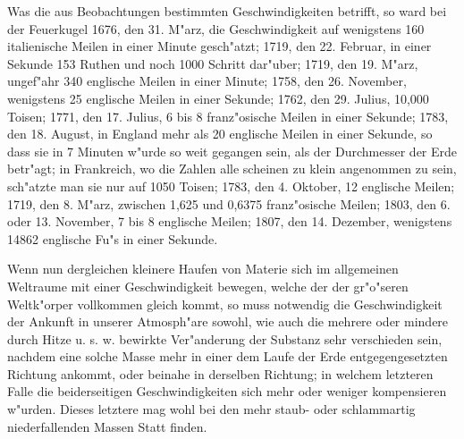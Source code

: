 \documentclass[a4paper, 11pt, oneside, polutonikogreek, german]{article}
\begin{document}
Was die aus Beobachtungen bestimmten Geschwindigkeiten betrifft, so ward bei der Feuerkugel 1676, den 31. M"arz, die Geschwindigkeit auf wenigstens 160 italienische Meilen in einer Minute gesch"atzt; 1719, den 22. Februar, in einer Sekunde 153 Ruthen und noch 1000 Schritt dar"uber; 1719, den 19. M"arz, ungef"ahr 340 englische Meilen in einer Minute; 1758, den 26. November, wenigstens 25 englische Meilen in einer Sekunde; 1762, den 29. Julius, 10,000 Toisen; 1771, den 17. Julius, 6 bis 8 franz"osische Meilen in einer Sekunde; 1783, den 18. August, in England mehr als 20 englische Meilen in einer Sekunde, so dass sie in 7 Minuten w"urde so weit gegangen sein, als der Durchmesser der Erde betr"agt; in Frankreich, wo die Zahlen alle scheinen zu klein angenommen zu sein, sch"atzte man sie nur auf 1050 Toisen; 1783, den 4. Oktober, 12 englische Meilen; 1719, den 8. M"arz, zwischen 1,625 und 0,6375 franz"osische Meilen; 1803, den 6. oder 13. November, 7 bis 8 englische Meilen; 1807, den 14. Dezember, wenigstens 14862 englische Fu"s in einer Sekunde.

Wenn nun dergleichen kleinere Haufen von Materie sich im allgemeinen Weltraume mit einer Geschwindigkeit bewegen, welche der der gr"o"seren Weltk"orper vollkommen gleich kommt, so muss notwendig die Geschwindigkeit der Ankunft in unserer Atmosph"are sowohl, wie auch die mehrere oder mindere durch Hitze u. s. w. bewirkte Ver"anderung der Substanz sehr verschieden sein, nachdem eine solche Masse mehr in einer dem Laufe der Erde entgegengesetzten Richtung ankommt, oder beinahe in derselben Richtung; in welchem letzteren Falle die beiderseitigen Geschwindigkeiten sich mehr oder weniger kompensieren w"urden. Dieses letztere mag wohl bei den mehr staub- oder schlammartig niederfallenden Massen Statt finden.
\subsection{}
\end{document}
